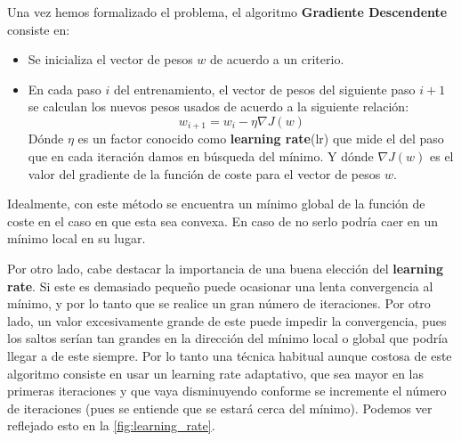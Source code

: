             \medskip

            \noindent Una vez hemos formalizado el problema, el algoritmo \textbf{Gradiente Descendente} consiste en: 
    
            \begin{itemize}
                \item Se inicializa el vector de pesos $w$ de acuerdo a un criterio.
                \item En cada paso $i$ del entrenamiento, el vector de pesos del siguiente paso $i+1$ se calculan los nuevos pesos usados de acuerdo a la siguiente relación: 
                \begin{equation}
                    w_{i+1}=w_i-\eta \nabla J(w)
                \end{equation}
                \noindent Dónde $\eta$ es un factor conocido como \textbf{learning rate}(lr) que mide el  del paso que en cada iteración damos en búsqueda del mínimo. Y dónde $\nabla J(w)$ es el valor del gradiente de la función de coste para el vector de pesos $w$. 
            \end{itemize}
    
            \noindent Idealmente, con este método se encuentra un mínimo global de la función de coste en el caso en que esta sea convexa. En caso de no serlo podría caer en un mínimo local en su lugar. 
    
            \medskip
    
            \noindent Por otro lado, cabe destacar la importancia de una buena elección del \textbf{learning rate}. Si este es demasiado pequeño puede ocasionar una lenta convergencia al mínimo, y por lo tanto que se realice un gran número de iteraciones. Por otro lado, un valor excesivamente grande de este puede impedir la convergencia, pues los saltos serían tan grandes en la dirección del mínimo local o global que podría llegar a  de este siempre. Por lo tanto una técnica habitual aunque costosa de este algoritmo consiste en usar un learning rate adaptativo, que sea mayor en las primeras iteraciones y que vaya disminuyendo conforme se incremente el número de iteraciones (pues se entiende que se estará cerca del mínimo). Podemos ver reflejado esto en la \autoref{fig:learning_rate}.

